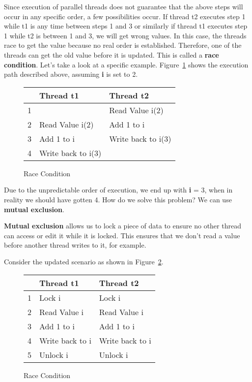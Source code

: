 \documentclass[letterpaper, 12pt]{article}
\begin{document}
Since execution of parallel threads does not guarantee that the above steps will occur in
any specific order, a few possibilities occur. If thread t2 executes step 1 while
t1 is any time between steps 1 and 3 or similarly if thread t1 executes step 1 while
t2 is between 1 and 3, we will get wrong values. In this case, the threads race
to get the value because no real order is established. Therefore, one of the
threads can get the old value before it is updated. This is called a {\bfseries race condition}.
Let's take a look at a specific example. Figure~\ref{fig:race_cond_2} shows the execution path described
above, assuming {\bfseries i} is set to 2.

\begin{figure}[H]
\centering
\begin{tabular}{|l|l|l|}
	\hline
	& {\bfseries Thread t1} & {\bfseries Thread t2} \\
	\hline
	1 &  & Read Value i(2) \\
	\hline
	2 & Read Value i(2) & Add 1 to i \\
	\hline
	3 & Add 1 to i & Write back to i(3) \\
	\hline
	4 & Write back to i(3) &  \\
	\hline
\end{tabular}
\caption{Race Condition}
\label{fig:race_cond_2}
\end{figure}

Due to the unpredictable order of execution, we end up with {\bfseries i} = 3,
when in reality we should have gotten 4. How do we solve this problem?
We can use {\bfseries mutual exclusion}.
\par\vspace{\baselineskip}

{\bfseries Mutual exclusion} allows us to lock a piece of data to ensure no other thread can
access  or edit it while it is locked. This ensures that we don't read a value
before another thread writes to it, for example.

\par\vspace{\baselineskip}

Consider the updated scenario as shown in Figure~\ref{fig:race_cond_3}.

\begin{figure}[H]
\centering
\begin{tabular}{|l|l|l|}
	\hline
	& {\bfseries Thread t1} & {\bfseries Thread t2} \\
	\hline
	1 & Lock i & Lock i \\
	\hline
	2 & Read Value i & Read Value i\\
	\hline
	3 & Add 1 to i & Add 1 to i \\
	\hline
	4 & Write back to i & Write back to i \\
	\hline
	5 & Unlock i & Unlock i \\
	\hline
\end{tabular}
\caption{Race Condition}
\label{fig:race_cond_3}
\end{figure}
\end{document}
